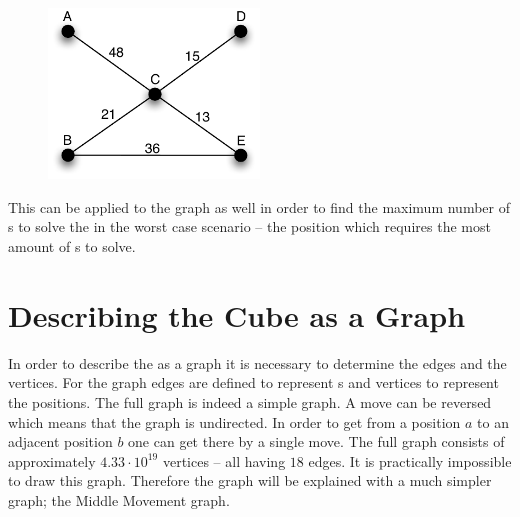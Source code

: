 \begin{figure}[htb]
	\centering
		\includegraphics[width = 0.5\textwidth]{input/pics/diameter}
	\caption{}
	\label{fig:diameter}
\end{figure}

This can be applied to the \rubik{} graph as well in order to find the maximum number of \twist{}s to solve the \rubik{} in the worst case scenario -- the position which requires the most amount of \twist{}s to solve. %


\section{Describing the Cube as a Graph}
In order to describe the \rubik{} as a graph it is necessary to determine the edges and the vertices. For the \rubik{} graph edges are defined to represent \twist{}s and vertices to represent the positions. 
The full \rubik{} graph is indeed a simple graph. A move can be reversed which means that the graph is undirected. In order to get from a position $a$ to an adjacent position $b$ one can get there by a single move. 
The full \rubik{} graph consists of approximately $4.33\cdot10^{19}$ vertices -- all having $18$ edges.
It is practically impossible to draw this graph. Therefore the graph will be explained with a much simpler graph; the Middle Movement graph.


